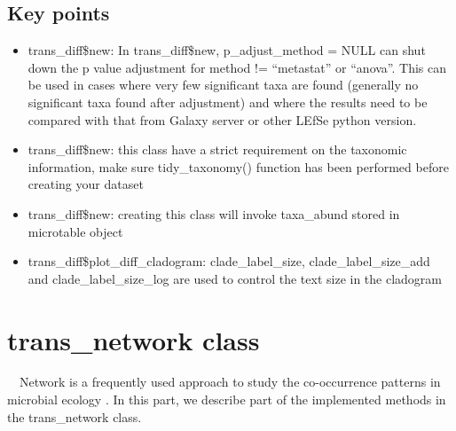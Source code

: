\documentclass[
]{book}
\newenvironment{Shaded}{\begin{snugshade}}{\end{snugshade}}
\newcommand{\AttributeTok}[1]{\textcolor[rgb]{0.77,0.63,0.00}{#1}}
\newcommand{\ConstantTok}[1]{\textcolor[rgb]{0.00,0.00,0.00}{#1}}
\newcommand{\DecValTok}[1]{\textcolor[rgb]{0.00,0.00,0.81}{#1}}
\newcommand{\FunctionTok}[1]{\textcolor[rgb]{0.00,0.00,0.00}{#1}}
\newcommand{\NormalTok}[1]{#1}
\newcommand{\SpecialCharTok}[1]{\textcolor[rgb]{0.00,0.00,0.00}{#1}}
\newcommand{\StringTok}[1]{\textcolor[rgb]{0.31,0.60,0.02}{#1}}
\providecommand{\tightlist}{%
  \setlength{\itemsep}{0pt}\setlength{\parskip}{0pt}}
\begin{document}
\begin{Shaded}
\end{Shaded}

\hypertarget{key-points-5}{%
\subsection{Key points}\label{key-points-5}}

\begin{itemize}
\tightlist
\item
  trans\_diff\$new: In trans\_diff\$new, p\_adjust\_method = NULL can shut down the p value adjustment for method != ``metastat'' or ``anova''.
  This can be used in cases where very few significant taxa are found (generally no significant taxa found after adjustment) and
  where the results need to be compared with that from Galaxy server or other LEfSe python version.
\item
  trans\_diff\$new: this class have a strict requirement on the taxonomic information, make sure tidy\_taxonomy() function has been performed before creating your dataset
\item
  trans\_diff\$new: creating this class will invoke taxa\_abund stored in microtable object
\item
  trans\_diff\$plot\_diff\_cladogram: clade\_label\_size, clade\_label\_size\_add and clade\_label\_size\_log are used to control the text size in the cladogram
\end{itemize}

\hypertarget{trans_network-class}{%
\section{trans\_network class}\label{trans_network-class}}

　Network is a frequently used approach to study the co-occurrence patterns in microbial ecology \citep{Deng_Molecular_2012, Faust_Microbial_2012, Coyte_Theecology_2015}.
In this part, we describe part of the implemented methods in the trans\_network class.
\end{document}
